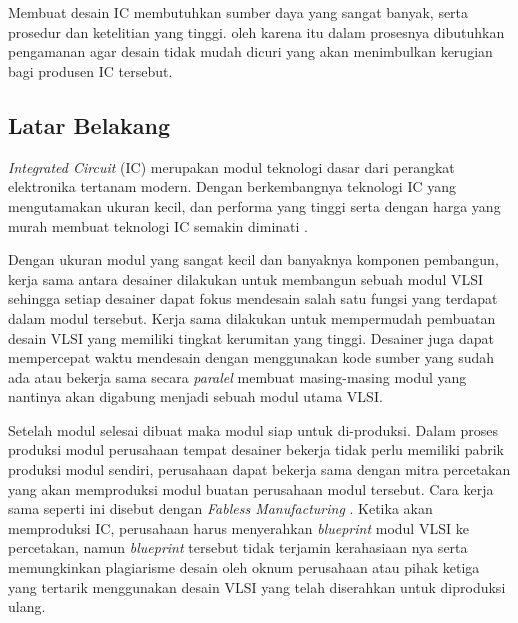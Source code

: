 % 

\chapter{\babSatu}
Membuat desain IC membutuhkan sumber daya yang sangat banyak, serta prosedur dan ketelitian yang tinggi. oleh karena itu dalam prosesnya dibutuhkan pengamanan agar desain tidak mudah dicuri yang akan menimbulkan kerugian bagi produsen IC tersebut.

% 

\section{Latar Belakang}
\textit{Integrated Circuit} (IC) merupakan modul teknologi dasar dari perangkat elektronika tertanam modern. Dengan berkembangnya teknologi IC yang mengutamakan ukuran kecil, dan performa yang tinggi serta dengan harga yang murah membuat teknologi IC semakin diminati \cite{latex.intro}.

Dengan ukuran modul yang sangat kecil dan banyaknya komponen pembangun, kerja sama antara desainer dilakukan untuk membangun sebuah modul VLSI sehingga setiap desainer dapat fokus mendesain salah satu fungsi yang terdapat dalam modul tersebut. Kerja sama dilakukan untuk mempermudah pembuatan desain VLSI yang memiliki tingkat kerumitan yang tinggi. Desainer juga dapat mempercepat waktu mendesain dengan menggunakan kode sumber yang sudah ada atau bekerja sama secara \textit{paralel} membuat masing-masing modul yang nantinya akan digabung menjadi sebuah modul utama VLSI.

Setelah modul selesai dibuat maka modul siap untuk di-produksi. Dalam proses produksi modul perusahaan tempat desainer bekerja tidak perlu memiliki pabrik produksi modul sendiri, perusahaan dapat bekerja sama dengan mitra percetakan yang akan memproduksi modul buatan perusahaan modul tersebut. Cara kerja sama seperti ini disebut dengan \textit{Fabless Manufacturing} \cite{vlsi.hist}. Ketika akan memproduksi IC, perusahaan harus menyerahkan \textit{blueprint} modul VLSI ke percetakan, namun \textit{blueprint} tersebut tidak terjamin kerahasiaan nya serta memungkinkan plagiarisme desain oleh oknum perusahaan atau pihak ketiga yang tertarik menggunakan desain VLSI yang telah diserahkan untuk diproduksi ulang.


